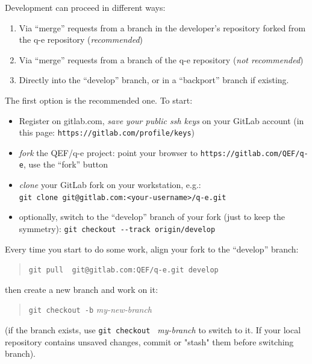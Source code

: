 \documentclass[12pt,a4paper]{article}
\begin{document}
Development can proceed in different ways:
\begin{enumerate}
\item Via ``merge'' requests from a branch in the developer's repository 
      forked from the q-e repository ({\em recommended})
\item Via ``merge'' requests from a branch of the q-e repository
      ({\em not recommended})
\item Directly into the ``develop'' branch, or in a ``backport'' branch
  if existing.
\end{enumerate}
The first option is the recommended one. To start:
\begin{itemize}
\item Register on gitlab.com, {\em save your public ssh keys}
  on your GitLab account (in this page: \verb|https://gitlab.com/profile/keys|)
\item {\em fork} the QEF/q-e project: point your browser to
	 \verb|https://gitlab.com/QEF/q-e|, use the ``fork'' button
\item {\em clone} your GitLab fork on your workstation, e.g.:\\
   \verb|git clone git@gitlab.com:<your-username>/q-e.git|
\item optionally, switch to the ``develop'' branch of your fork
   (just to keep the symmetry):
   \verb|git checkout --track origin/develop|
\end{itemize}
Every time you start to do some work, align your fork to the
``develop'' branch:
\begin{quote}
  \verb|git pull  git@gitlab.com:QEF/q-e.git develop| 
\end{quote}
then create a new branch and work on it:
\begin{quote}
   \verb|git checkout -b| {\em my-new-branch}
\end{quote}
(if the branch exists, use \verb|git checkout | {\em my-branch} to
switch to it. If your local repository contains unsaved changes,
commit or "stash" them before switching branch).
\end{document}
